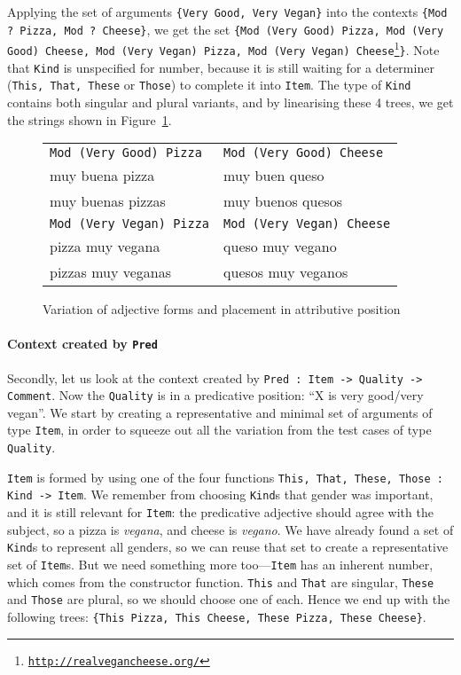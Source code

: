 \documentclass[11pt]{article}
\def\t#1{\texttt{#1}}
\begin{document}
Applying the set of arguments \t{\{Very Good, Very Vegan\}} into the
contexts \t{\{Mod ? Pizza, Mod ? Cheese\}}, we get the set \t{\{Mod
  (Very Good) Pizza, Mod (Very Good) Cheese, Mod (Very Vegan) Pizza,
  Mod (Very Vegan)
  Cheese\footnote{\url{http://realvegancheese.org/}}\}}. Note that
\t{Kind} is unspecified for number, because it is still waiting for a
determiner (\t{This, That, These} or \t{Those}) to complete it into
\t{Item}. The type of \t{Kind} contains both singular and plural
variants, and by linearising these 4 trees, we get the strings shown
in Figure~\ref{fig:veganCheese}.

\begin{figure}
\centering
\begin{tabular}{| l | l |}
\hline
\t{Mod (Very Good) Pizza}   & \t{Mod (Very Good) Cheese} \\ 
muy buena pizza             & muy buen queso \\
muy buenas pizzas           & muy buenos quesos \\ \hline

\t{Mod (Very Vegan) Pizza}  & \t{Mod (Very Vegan) Cheese} \\
pizza muy vegana            & queso muy vegano \\
pizzas muy veganas          & quesos muy veganos \\ \hline
\end{tabular}
\caption{Variation of adjective forms and placement in attributive position}
\label{fig:veganCheese}
\end{figure}

\paragraph{Context created by \t{Pred}} 
Secondly, let us look at the context created by \t{Pred : Item ->
  Quality -> Comment}. Now the \t{Quality} is in a predicative
position: ``X is very good/very vegan''. We start by creating a
representative and minimal set of arguments of type \t{Item}, in order
to squeeze out all the variation from the test cases of type
\t{Quality}.

\t{Item} is formed by using one of the four functions \t{This, That, These, Those : Kind -> Item}.
We remember from choosing \t{Kind}s that gender was important, and it
is still relevant for \t{Item}: the predicative adjective should agree
with the subject, so a pizza is \emph{vegana}, and cheese is
\emph{vegano}. We have already found a set of \t{Kind}s to represent
all genders, so we can reuse that set to create a representative set
of \t{Item}s. But we need something more too---\t{Item} has an
inherent number, which comes from the constructor function. \t{This}
and \t{That} are singular, \t{These} and \t{Those} are plural, so we
should choose one of each. Hence we end up with the following trees:
\t{\{This Pizza, This Cheese, These Pizza, These Cheese\}}. 
\end{document}
